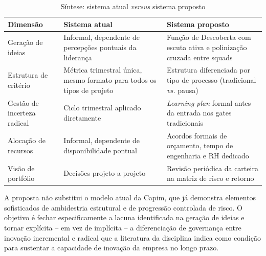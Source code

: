 \begin{table}[H]
  \centering
  \caption{Síntese: sistema atual \textit{versus} sistema proposto}
  \label{tab:sintese-proposta}
  \begin{tabularx}{\textwidth}{lXX}
    \toprule
    \textbf{Dimensão} & \textbf{Sistema atual} & \textbf{Sistema proposto} \\
    \midrule
    Geração de ideias & Informal, dependente de percepções pontuais da liderança & Função de Descoberta com escuta ativa e polinização cruzada entre squads \\
    Estrutura de critério & Métrica trimestral única, mesmo formato para todos os tipos de projeto & Estrutura diferenciada por tipo de processo (tradicional \textit{vs.} pausa) \\
    Gestão de incerteza radical & Ciclo trimestral aplicado diretamente & \textit{Learning plan} formal antes da entrada nos gates tradicionais \\
    Alocação de recursos & Informal, dependente de disponibilidade pontual & Acordos formais de orçamento, tempo de engenharia e RH dedicado \\
    Visão de portfólio & Decisões projeto a projeto & Revisão periódica da carteira na matriz de risco e retorno \\
    \bottomrule
  \end{tabularx}
\end{table}

A proposta não substitui o modelo atual da Capim, que já demonstra elementos sofisticados de ambidestria estrutural e de progressão controlada de risco. O objetivo é fechar especificamente a lacuna identificada na geração de ideias e tornar explícita -- em vez de implícita -- a diferenciação de governança entre inovação incremental e radical que a literatura da disciplina indica como condição para sustentar a capacidade de inovação da empresa no longo prazo.
